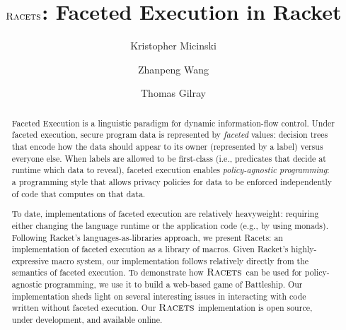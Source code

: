 \documentclass[review=true,acmlarge]{acmart}
\newcommand{\racets}[0]{$\textsc{Racets}$\xspace}
\begin{document}
\title{\racets: Faceted Execution in Racket}

\author{Kristopher Micinski}
\author{Zhanpeng Wang}
\author{Thomas Gilray}

\begin{abstract}
Faceted Execution is a linguistic paradigm for dynamic
information-flow control. Under faceted execution, secure program data
is represented by \emph{faceted} values: decision trees that encode how the
data should appear to its owner (represented by a label) versus everyone
else. When labels are allowed to be first-class (i.e., predicates that
decide at runtime which data to reveal), faceted execution enables
\emph{policy-agnostic programming}: a programming style that allows
privacy policies for data to be enforced independently of code that
computes on that data.

To date, implementations of faceted execution are relatively
heavyweight: requiring either changing the language runtime or the
application code (e.g., by using monads). Following Racket's
languages-as-libraries approach, we present Racets: an implementation
of faceted execution as a library of macros.  Given Racket's
highly-expressive macro system, our implementation follows relatively
directly from the semantics of faceted execution. To demonstrate how
\racets can be used for policy-agnostic programming, we use it to
build a web-based game of Battleship. Our implementation sheds light
on several interesting issues in interacting with code written without
faceted execution. Our \racets implementation is open source, under
development, and available online.
\end{abstract}

\end{document}
